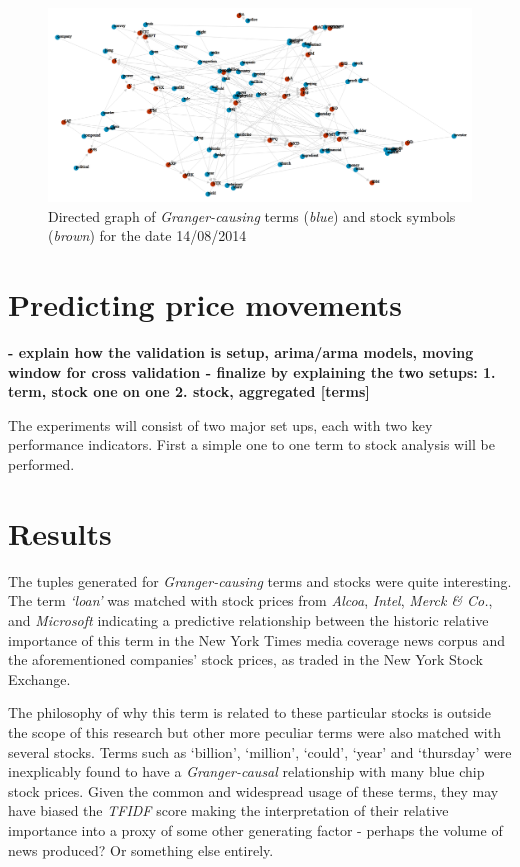 \documentclass{article}
\begin{document}
\begin{figure}[!htbp]
\centering
\includegraphics[width=\textwidth,height=\textheight,keepaspectratio]{force_20140814}
\caption{Directed graph of \textit{Granger-causing} terms (\textit{blue}) and stock symbols (\textit{brown}) for the date 14/08/2014}
\label{fig:1}
\end{figure}

\section{Predicting price movements}
\textbf{- explain how the validation is setup, arima/arma models, moving window for cross validation
- finalize by explaining the two setups:
  1. term, stock one on one
  2. stock, aggregated [terms]}
\par

The experiments will consist of two major set ups, each with two key performance indicators. First a simple one to one term to stock analysis will be performed.

\section{Results}
The tuples generated for \textit{Granger-causing} terms and stocks were quite interesting. The term \textit{`loan'} was matched with stock prices from \textit{Alcoa}, \textit{Intel}, \textit{Merck \& Co.}, and \textit{Microsoft} indicating a predictive relationship between the historic relative importance of this term in the New York Times media coverage news corpus and the aforementioned companies' stock prices, as traded in the New York Stock Exchange.

\par
The philosophy of why this term is related to these particular stocks is outside the scope of this research but other more peculiar terms were also matched with several stocks. Terms such as `billion', `million', `could', `year' and `thursday'  were inexplicably found to have a \textit{Granger-causal} relationship with many blue chip stock prices. Given the common and widespread usage of these terms, they may have biased the \textit{TFIDF} score making the interpretation of their relative importance into a proxy of some other generating factor - perhaps the volume of news produced? Or something else entirely.
\end{document}
